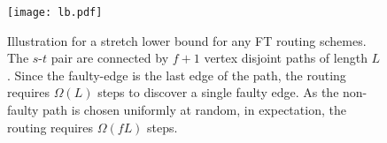 \begin{figure}[h!]
\begin{center}
\texttt{[image: lb.pdf]}
\caption{\sf Illustration for a stretch lower bound for any FT routing schemes. The $s$-$t$ pair are connected by $f+1$ vertex disjoint paths of length $L$. Since the faulty-edge is the last edge of the path, the routing requires $\Omega(L)$ steps to discover a single faulty edge. As the non-faulty path is chosen uniformly at random, in expectation, the routing requires $\Omega(fL)$ steps.  \label{fig:LB-stretch}
}
\end{center}
\end{figure}

